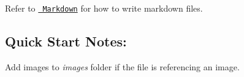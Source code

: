 Refer to \href{http://daringfireball.net/projects/markdown/}{\texttt{ Markdown}} for how to write markdown files. \subsection*{Quick Start Notes\+:}


\begin{DoxyEnumerate}
\item Add images to {\itshape images} folder if the file is referencing an image. 
\end{DoxyEnumerate}